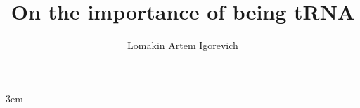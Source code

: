 \documentclass[english, twoside, titlepage, DIV=8, BCOR=8.5mm, open=right, chapterprefix=false]{scrbook}
\title{On the importance of being tRNA}
\author{Lomakin Artem Igorevich}
\begin{document}
\emergencystretch 3em %

\maketitle

\mainmatter








\backmatter

\printbibliography
\end{document}
